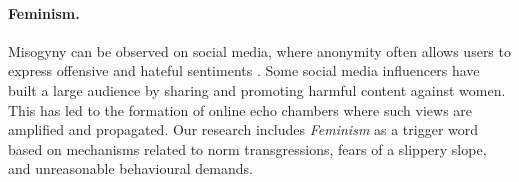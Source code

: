 \paragraph{Feminism.} Misogyny can be observed on social media, where anonymity often allows users to express offensive and hateful sentiments \cite{barker2019online}. Some social media influencers have built a large audience by sharing and promoting harmful content against women. This has led to the formation of online echo chambers \cite{farrell2019exploring} where such views are amplified and propagated. Our research includes \textit{Feminism} as a trigger word based on mechanisms related to norm transgressions, fears of a slippery slope, and unreasonable behavioural demands. 


\begin{table}[]
\centering
{}
\caption{Subreddits selected for each trigger word. }
\label{tab:keywords_subreddits}
\end{table}


